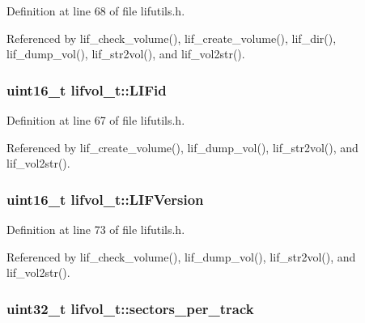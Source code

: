 Definition at line 68 of file lifutils.\+h.



Referenced by lif\+\_\+check\+\_\+volume(), lif\+\_\+create\+\_\+volume(), lif\+\_\+dir(), lif\+\_\+dump\+\_\+vol(), lif\+\_\+str2vol(), and lif\+\_\+vol2str().

\subsubsection[{\texorpdfstring{L\+I\+Fid}{LIFid}}]{\setlength{\rightskip}{0pt plus 5cm}uint16\+\_\+t lifvol\+\_\+t\+::\+L\+I\+Fid}\hypertarget{structlifvol__t_adb6a0c2fff5b765eb12c3eb5db6d5bad}{}\label{structlifvol__t_adb6a0c2fff5b765eb12c3eb5db6d5bad}


Definition at line 67 of file lifutils.\+h.



Referenced by lif\+\_\+create\+\_\+volume(), lif\+\_\+dump\+\_\+vol(), lif\+\_\+str2vol(), and lif\+\_\+vol2str().

\subsubsection[{\texorpdfstring{L\+I\+F\+Version}{LIFVersion}}]{\setlength{\rightskip}{0pt plus 5cm}uint16\+\_\+t lifvol\+\_\+t\+::\+L\+I\+F\+Version}\hypertarget{structlifvol__t_afffd824a7b0ce6aa8410fa243733475f}{}\label{structlifvol__t_afffd824a7b0ce6aa8410fa243733475f}


Definition at line 73 of file lifutils.\+h.



Referenced by lif\+\_\+check\+\_\+volume(), lif\+\_\+dump\+\_\+vol(), lif\+\_\+str2vol(), and lif\+\_\+vol2str().

\subsubsection[{\texorpdfstring{sectors\+\_\+per\+\_\+track}{sectors_per_track}}]{\setlength{\rightskip}{0pt plus 5cm}uint32\+\_\+t lifvol\+\_\+t\+::sectors\+\_\+per\+\_\+track}\hypertarget{structlifvol__t_ad245f7419e180934262f53acd9b4349c}{}\label{structlifvol__t_ad245f7419e180934262f53acd9b4349c}


